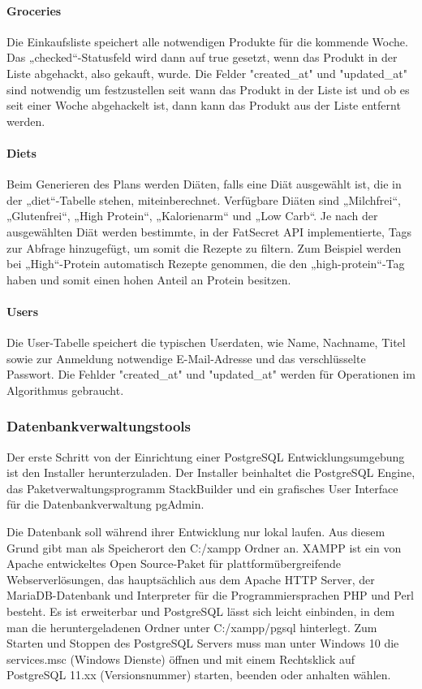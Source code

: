 \paragraph{Groceries}
Die Einkaufsliste speichert alle notwendigen Produkte für die kommende Woche. Das „checked“-Statusfeld wird dann auf true gesetzt, wenn das Produkt in der Liste abgehackt, also gekauft, wurde. Die Felder "created\_at" und "updated\_at" sind notwendig um festzustellen seit wann das Produkt in der Liste ist und ob es seit einer Woche abgehackelt ist, dann kann das Produkt aus der Liste entfernt werden.
\paragraph{Diets}
Beim Generieren des Plans werden Diäten, falls eine Diät ausgewählt ist, die in der „diet“-Tabelle stehen, miteinberechnet. Verfügbare Diäten sind „Milchfrei“, „Glutenfrei“, „High Protein“, „Kalorienarm“ und „Low Carb“. Je nach der ausgewählten Diät werden bestimmte, in der FatSecret API implementierte, Tags zur Abfrage hinzugefügt, um somit die Rezepte zu filtern. Zum Beispiel werden bei „High“-Protein automatisch Rezepte genommen, die den „high-protein“-Tag haben und somit einen hohen Anteil an Protein besitzen.

\paragraph{Users}
Die User-Tabelle speichert die typischen Userdaten, wie Name, Nachname, Titel sowie zur Anmeldung notwendige E-Mail-Adresse und das verschlüsselte Passwort. Die Fehlder "created\_at" und "updated\_at" werden für Operationen im Algorithmus gebraucht.

\subsubsection{Datenbankverwaltungstools}
Der erste Schritt von der Einrichtung einer PostgreSQL Entwicklungsumgebung ist den Installer herunterzuladen. Der Installer beinhaltet die PostgreSQL Engine, das Paketverwaltungsprogramm StackBuilder und ein grafisches User Interface für die Datenbankverwaltung pgAdmin. 

Die Datenbank soll während ihrer Entwicklung nur lokal laufen. Aus diesem Grund gibt man als Speicherort den C:/xampp Ordner an. XAMPP ist ein von Apache entwickeltes Open Source-Paket für plattformübergreifende Webserverlösungen, das hauptsächlich aus dem Apache HTTP Server, der MariaDB-Datenbank und Interpreter für die Programmiersprachen PHP und Perl besteht. Es ist erweiterbar und PostgreSQL lässt sich leicht einbinden, in dem man die heruntergeladenen Ordner unter C:/xampp/pgsql hinterlegt. Zum Starten und Stoppen des PostgreSQL Servers muss man unter Windows 10 die services.msc (Windows Dienste) öffnen und mit einem Rechtsklick auf PostgreSQL 11.xx (Versionsnummer) starten, beenden oder anhalten wählen.


